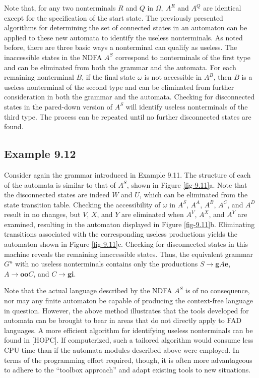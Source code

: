 \begin{thm}
Note that, for any two nonterminals $R$ and $Q$ in $\Omega,\ A^R$ and $A^Q$ are
identical except for the specification of the start state. The previously
presented algorithms for determining the set of connected states in an automaton
can be applied to these new automata to identify the useless nonterminals. As
noted before, there are three basic ways a nonterminal can qualify as useless.
The inaccessible states in the NDFA $A^S$ correspond to nonterminals of the
first type and can be eliminated from both the grammar and the automata. For
each remaining nonterminal $B$, if the final state $\omega$ is not accessible
in $A^B$, then $B$ is a useless nonterminal of the second type and can be
eliminated from further consideration in both the grammar and the automata.
Checking for disconnected states in the pared-down version of $A^S$ will
identify useless nonterminals of the third type. The process can be repeated
until no further disconnected states are found.
\end{thm}

\subsection*{Example 9.12}

Consider again the grammar introduced in Example 9.11. The structure of each
of the automata is similar to that of $A^S$, shown in Figure \ref{fig-9.11}a. Note that
the disconnected states are indeed $W$ and $U$, which can be eliminated from the
state transition table. Checking the accessibility of $\omega$ in $A^S$, $A^A$,
$A^B$, $A^C$, and $A^D$ result in no changes, but $V$, $X$, and $Y$ are
eliminated when $A^V$, $A^X$, and $A^Y$ are examined, resulting in the automaton
displayed in Figure \ref{fig-9.11}b. Eliminating transitions associated with the
corresponding useless productions yields the automaton shown in Figure \ref{fig-9.11}c.
Checking for disconnected states in this machine reveals the remaining
inaccessible states. Thus, the equivalent grammar $G^u$ with no useless
nonterminals contains only the productions $S\rightarrow\pmb{g}A\pmb{e}$, $A
\rightarrow\pmb{oo}C$, and $C\rightarrow\pmb{gi}$.

Note that the actual language described by the NDFA $A^S$ is of no consequence,
nor may any finite automaton be capable of producing the context-free language
in question. However, the above method illustrates that the tools developed for
automata can be brought to bear in areas that do not directly apply to FAD
languages. A more efficient algorithm for identifying useless nonterminals can
be found in [HOPC]. If computerized, such a tailored algorithm would consume
less CPU time than if the automata modules described above were employed. In
terms of the programming effort required, though, it is often more advantageous
to adhere to the ``toolbox approach'' and adapt existing tools to new situations.

